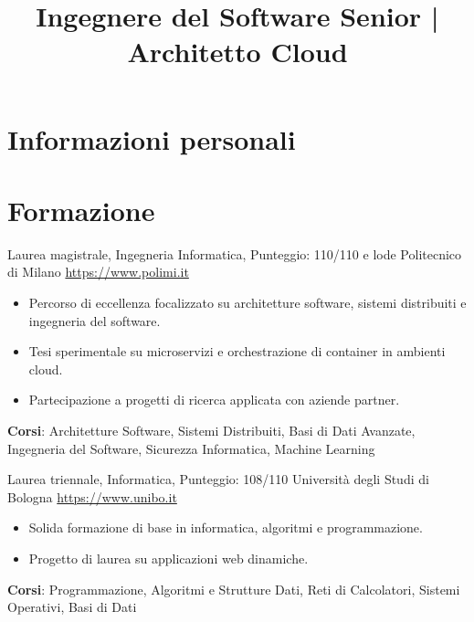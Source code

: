 \documentclass[a4paper, serif, 10pt]{moderncv}
\title{Ingegnere del Software Senior | Architetto Cloud}
\begin{document}
\maketitle

\section{Informazioni personali}

\section{Formazione}

        {Laurea magistrale, Ingegneria Informatica, Punteggio: 110/110 e lode}
        {Politecnico di Milano}
        {\url{https://www.polimi.it}}
        {}
        {\begin{itemize}
\item Percorso di eccellenza focalizzato su architetture software, sistemi distribuiti e ingegneria del software.
\item Tesi sperimentale su microservizi e orchestrazione di container in ambienti cloud.
\item Partecipazione a progetti di ricerca applicata con aziende partner.
\end{itemize}
\textbf{Corsi}: Architetture Software, Sistemi Distribuiti, Basi di Dati Avanzate, Ingegneria del Software, Sicurezza Informatica, Machine Learning}

        {Laurea triennale, Informatica, Punteggio: 108/110}
        {Università degli Studi di Bologna}
        {\url{https://www.unibo.it}}
        {}
        {\begin{itemize}
\item Solida formazione di base in informatica, algoritmi e programmazione.
\item Progetto di laurea su applicazioni web dinamiche.
\end{itemize}
\textbf{Corsi}: Programmazione, Algoritmi e Strutture Dati, Reti di Calcolatori, Sistemi Operativi, Basi di Dati}
\end{document}

